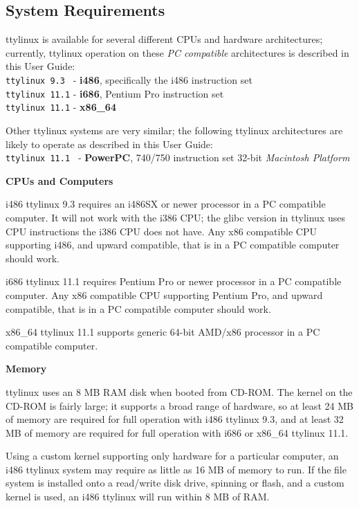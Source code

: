 \documentclass[10pt]{article}
\begin{document}
\subsection{System Requirements}

ttylinux is available for several different CPUs and hardware architectures;
currently, ttylinux operation on these {\it PC compatible} architectures is
described in this User Guide:\\
{\tt ttylinux 9.3 } - {\bf i486}, specifically the i486 instruction set\\
{\tt ttylinux 11.1} - {\bf i686}, Pentium Pro instruction set\\
{\tt ttylinux 11.1} - {\bf x86\_64}

Other ttylinux systems are very similar; the following ttylinux architectures
are likely to operate as described in this User Guide:\\
{\tt ttylinux 11.1 } - {\bf PowerPC}, 740/750 instruction set 32-bit {\it Macintosh Platform}

{\bf CPUs and Computers}

i486 ttylinux 9.3 requires an i486SX or newer processor in a PC compatible
computer. It will not work with the i386 CPU; the glibc version in ttylinux
uses CPU instructions the i386 CPU does not have. Any x86 compatible CPU
supporting i486, and upward compatible, that is in a PC compatible computer
should work.

i686 ttylinux 11.1 requires Pentium Pro or newer processor in a PC compatible
computer. Any x86 compatible CPU supporting Pentium Pro, and upward compatible,
that is in a PC compatible computer should work.

x86\_64 ttylinux 11.1 supports generic 64-bit AMD/x86 processor in a PC
compatible computer.

{\bf Memory}

ttylinux uses an 8 MB RAM disk when booted from CD-ROM. The kernel on the
CD-ROM is fairly large; it supports a broad range of hardware, so at least 24
MB of memory are required for full operation with i486 ttylinux 9.3, and at
least 32 MB of memory are required for full operation with i686 or x86\_64
ttylinux 11.1.

Using a custom kernel supporting only hardware for a particular computer, an
i486 ttylinux system may require as little as 16 MB of memory to run. If the
file system is installed onto a read/write disk drive, spinning or flash, and a
custom kernel is used, an i486 ttylinux will run within 8 MB of RAM.
\end{document}
